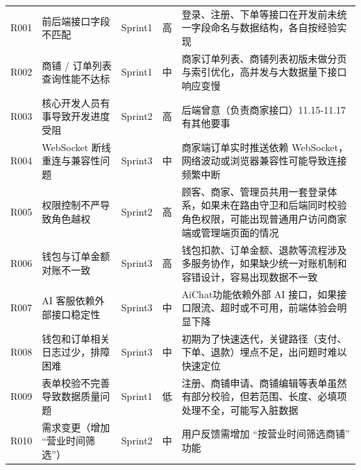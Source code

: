 \begin{longtable}{>{\centering\arraybackslash}m{1cm} >{\centering\arraybackslash}m{3cm} >{\centering\arraybackslash}m{1cm} >{\centering\arraybackslash}m{1.5cm} >{\centering\arraybackslash}m{7cm}}
    R001           & 前后端接口字段不匹配           & Sprint1       & 高            & 登录、注册、下单等接口在开发前未统一字段命名与数据结构，各自按经验实现                          \\
    R002           & 商铺 / 订单列表查询性能不达标     & Sprint1       & 中            & 商家订单列表、商铺列表初版未做分页与索引优化，高并发与大数据量下接口响应变慢                       \\
    R003           & 核心开发人员有事导致开发进度受阻     & Sprint2       & 高            & 后端曾意（负责商家接口）11.15-11.17 有其他要事                                \\
    R004           & WebSocket 断线重连与兼容性问题 & Sprint3       & 中            & 商家端订单实时推送依赖 WebSocket，网络波动或浏览器兼容性可能导致连接频繁中断                  \\
    R005           & 权限控制不严导致角色越权         & Sprint2       & 高            & 顾客、商家、管理员共用一套登录体系，如果未在路由守卫和后端同时校验角色权限，可能出现普通用户访问商家端或管理端页面的情况 \\
    R006           & 钱包与订单金额对账不一致         & Sprint3       & 高            & 钱包扣款、订单金额、退款等流程涉及多服务协作，如果缺少统一对账机制和容错设计，容易出现数据不一致             \\
    R007           & AI 客服依赖外部接口稳定性       & Sprint3       & 中            & AiChat功能依赖外部 AI 接口，如果接口限流、超时或不可用，前端体验会明显下降                   \\
    R008           & 钱包和订单相关日志过少，排障困难     & Sprint3       & 中            & 初期为了快速迭代，关键路径（支付、下单、退款）埋点不足，出问题时难以快速定位                       \\
    R009           & 表单校验不完善导致数据质量问题      & Sprint1       & 低            & 注册、商铺申请、商铺编辑等表单虽然有部分校验，但若范围、长度、必填项处理不全，可能写入脏数据               \\
    R010           & 需求变更（增加 “营业时间筛选”）    & Sprint2       & 中            & 用户反馈需增加 “按营业时间筛选商铺” 功能                                       \\
\end{longtable}


